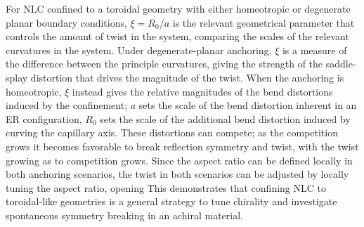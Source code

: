 For NLC confined to a toroidal geometry with either homeotropic or degenerate planar boundary conditions, $\xi = R_0/a$ is the relevant geometrical parameter that controls the amount of twist in the system, comparing the scales of the relevant curvatures in the system.
Under degenerate-planar anchoring, $\xi$ is a measure of the difference between the principle curvatures, giving the strength of the saddle-splay distortion that drives the magnitude of the twist.
When the anchoring is homeotropic, $\xi$ instead gives the relative magnitudes of the bend distortions induced by the confinement; $a$ sets the scale of the bend distortion inherent in an ER configuration, $R_0$ sets the scale of the additional bend distortion induced by curving the capillary axis.
These distortions can compete; as the competition grows it becomes favorable to break reflection symmetry and twist, with the twist growing as to competition grows.
Since the aspect ratio can be defined locally in both anchoring scenarios, the twist in both scenarios can be adjusted by locally tuning the aspect ratio, opening
This demonstrates that confining NLC to toroidal-like geometries is a general strategy to tune chirality and investigate spontaneous symmetry breaking in an achiral material.
